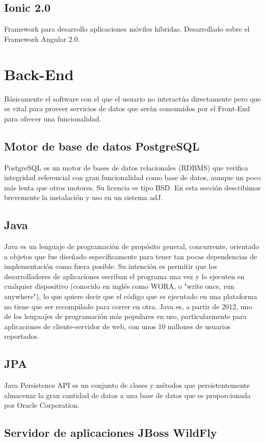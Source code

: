 \subsection{Ionic 2.0}

Framework para desarrollo aplicaciones móviles híbridas. Desarrollado sobre el Framework Angular 2.0. 

\section{Back-End}

Básicamente el software con el que el usuario no interactúa directamente pero que es vital para proveer servicios de datos que serán consumidos por el Front-End para ofrecer una funcionalidad.

\subsection{Motor de base de datos PostgreSQL}

PostgreSQL es un motor de bases de datos relacionales (RDBMS) que verifica integridad referencial con gran funcionalidad como base de datos, aunque un poco más lenta que otros motores. Su licencia es tipo BSD. En esta sección describimos brevemente la instalación y uso en un sistema adJ.

\subsection{Java}

Java es un lenguaje de programación de propósito general, concurrente, orientado a objetos que fue diseñado específicamente para tener tan pocas dependencias de implementación como fuera posible. Su intención es permitir que los desarrolladores de aplicaciones escriban el programa una vez y lo ejecuten en cualquier dispositivo (conocido en inglés como WORA, o "write once, run anywhere"), lo que quiere decir que el código que es ejecutado en una plataforma no tiene que ser recompilado para correr en otra. Java es, a partir de 2012, uno de los lenguajes de programación más populares en uso, particularmente para aplicaciones de cliente-servidor de web, con unos 10 millones de usuarios reportados.

\subsection{JPA}

Java Persistence API es un conjunto de clases y métodos que persistentemente almacenar la gran cantidad de datos a una base de datos que es proporcionada por Oracle Corporation.

\subsection{Servidor de aplicaciones JBoss WildFly}


